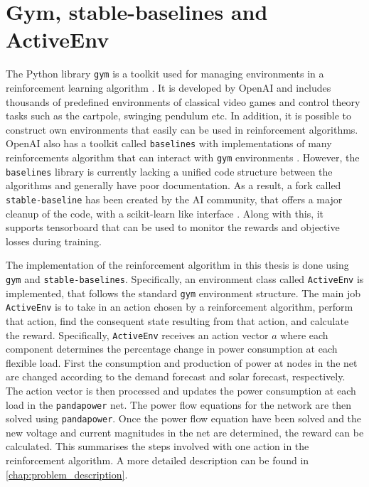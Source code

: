 \documentclass[class=book, crop=false, 11pt]{standalone}
\begin{document}
\section{Gym, stable-baselines and ActiveEnv}
The Python library \texttt{gym} is a toolkit used for managing environments in a reinforcement learning algorithm \cite{openai_gym}. It is developed by OpenAI and includes thousands of predefined environments of classical video games and control theory tasks such as the cartpole, swinging pendulum etc. In addition, it is possible to construct own environments that easily can be used in reinforcement algorithms. OpenAI also has a toolkit called \texttt{baselines} with implementations of many reinforcements algorithm that can interact with \texttt{gym} environments \cite{openai_baselines}. However, the \texttt{baselines} library is currently lacking a unified code structure between the algorithms and generally have poor documentation. As a result, a fork called \texttt{stable-baseline} has been created by the AI community, that offers a major cleanup of the code, with a scikit-learn like interface \cite{stable_baselines}. Along with this, it supports tensorboard that can be used to monitor the rewards and objective losses during training.

The implementation of the reinforcement algorithm in this thesis is done using \texttt{gym} and \texttt{stable-baselines}. Specifically, an environment class called \texttt{ActiveEnv} is implemented, that follows the standard \texttt{gym} environment structure. The main job \texttt{ActiveEnv} is to take in an action chosen by a reinforcement algorithm, perform that action, find the consequent state resulting from that action, and calculate the reward. Specifically, \texttt{ActiveEnv} receives an action vector $a$ where each component determines the percentage change in power consumption at each flexible load. First the consumption and production of power at nodes in the net are changed according to the demand forecast and solar forecast, respectively. The action vector is then processed and updates the power consumption at each load in the \texttt{pandapower} net. The power flow equations for the network are then solved using \texttt{pandapower}. Once the power flow equation have been solved and the new voltage and current magnitudes in the net are determined, the reward can be calculated. This summarises the steps involved with one action in the reinforcement algorithm. A more detailed description can be found in \ref{chap:problem_description}.   
\end{document}

